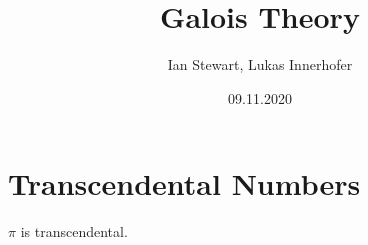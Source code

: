\documentclass{book}
\title{Galois Theory}
\author{Ian Stewart, Lukas Innerhofer}
\date{09.11.2020}
\begin{document}
    \maketitle
    \tableofcontents

    

    \chapter{Transcendental Numbers}
    \begin{theorem} \label{theorem: pi is transcendental}
        $\pi$ is transcendental.
    \end{theorem}
\end{document}
